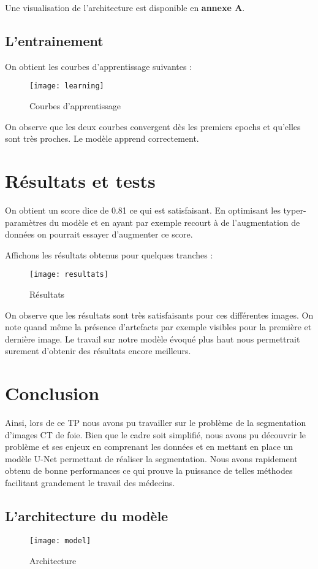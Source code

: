 \documentclass[12pt,a4paper,titlepage]{scrartcl}
\begin{document}
Une visualisation de l'architecture est disponible en \textbf{annexe A}.

\subsection{L'entrainement}

On obtient les courbes d'apprentissage suivantes :

\begin{figure}[H]
    \caption{Courbes d'apprentissage}
    \texttt{[image: learning]}
    \centering
\end{figure}

On observe que les deux courbes convergent dès les premiers epochs et qu'elles sont très
proches. Le modèle apprend correctement.

\section{Résultats et tests}

On obtient un score dice de 0.81 ce qui est satisfaisant. En optimisant les typer-paramètres
du modèle et en ayant par exemple recourt à de l'augmentation de données on pourrait essayer
d'augmenter ce score.

Affichons les résultats obtenus pour quelques tranches :

\begin{figure}[H]
    \caption{Résultats}
    \texttt{[image: resultats]}
    \centering
\end{figure}

On observe que les résultats sont très satisfaisants pour ces différentes images. On note quand
même la présence d'artefacts par exemple visibles pour la première et dernière image. Le travail
sur notre modèle évoqué plus haut nous permettrait surement d'obtenir des résultats encore
meilleurs.

\section*{Conclusion}

Ainsi, lors de ce TP nous avons pu travailler sur le problème de la segmentation d'images CT
de foie. Bien que le cadre soit simplifié, nous avons pu découvrir le problème et ses enjeux
en comprenant les données et en mettant en place un modèle U-Net permettant de réaliser la
segmentation. Nous avons rapidement obtenu de bonne performances ce qui prouve la
puissance de telles méthodes facilitant grandement le travail des médecins.

\begin{appendices}

    \section{L'architecture du modèle}

    \begin{figure}[H]
        \caption{Architecture}
        \texttt{[image: model]}
        \centering
    \end{figure}

\end{appendices}
\end{document}
